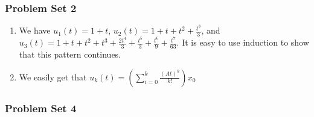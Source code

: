 \documentclass{article}
\begin{document}
    \subsubsection*{Problem Set 2}

    \begin{enumerate}
        \item We have $u_1(t)=1+t$, $u_2(t)=1+t+t^2+\frac{t^3}{3}$, and $u_3(t)=1+t+t^2+t^3+\frac{2t^4}{3}+\frac{t^5}{3}+\frac{t^6}{9}+\frac{t^7}{63}$. It is easy to use induction to show that this pattern continues.
        \item We easily get that $u_k(t)=(\sum_{i=0}^k\frac{(At)^k}{k!})x_0$
    \end{enumerate}

    \subsubsection*{Problem Set 4}
\end{document}
